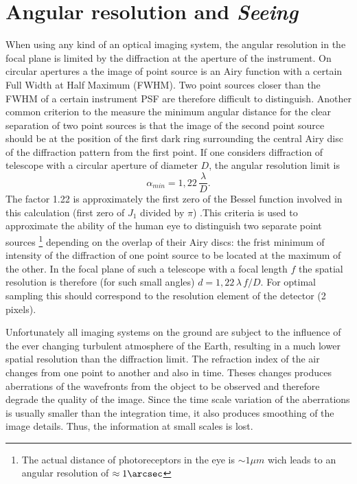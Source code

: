 \section{Angular resolution and \emph{Seeing}\label{seeing}}
When using any kind of an optical imaging system, the angular resolution in the focal plane is limited by the diffraction at the aperture of the instrument. On circular apertures a the image of point source is an Airy function with a certain Full Width at Half Maximum (FWHM). Two point sources closer than the FWHM of a certain instrument PSF  are therefore difficult to distinguish. Another common criterion to the measure the minimum angular distance for the clear separation of two point sources is that the image of the second point source should be at the position of the first dark ring surrounding the central Airy disc of the diffraction pattern from the first point. If one considers diffraction of telescope with a circular aperture of diameter $D$, the angular resolution limit is
\begin{equation}
\alpha_{min}=1,22 \, \frac{ \lambda}{D}.
\label{ec:res}
\end{equation}
The factor 1.22 is approximately the first zero of the Bessel function involved in this calculation (first zero of $J_{1}$ divided by $\pi$) .This criteria is used to approximate the ability of the human eye to distinguish two separate point sources \footnote{The actual distance of photoreceptors in the eye is $\sim1\mu m$ wich leads to an angular resolution of $\approx1\arcsec$} depending on the overlap of their Airy discs: the frist minimum of intensity of the diffraction of one point source to be located at the maximum of the other. In the focal plane of such a telescope with a focal length $f$ the spatial resolution is therefore (for such small angles) $d=1,22 \, \lambda\, f/D$. For optimal sampling this should correspond to the resolution element of the detector (2 pixels).

Unfortunately all imaging systems on the ground are subject to the influence of the ever changing turbulent atmosphere of the Earth, resulting in a much lower spatial resolution than the diffraction limit. The refraction index of the air changes from one point to another and also in time. Theses changes produces aberrations of the wavefronts from the object to be observed and therefore degrade the quality of the image. Since the time scale variation of the aberrations is usually smaller than the integration time, it also produces smoothing of the image details. Thus, the information at small scales is lost.

